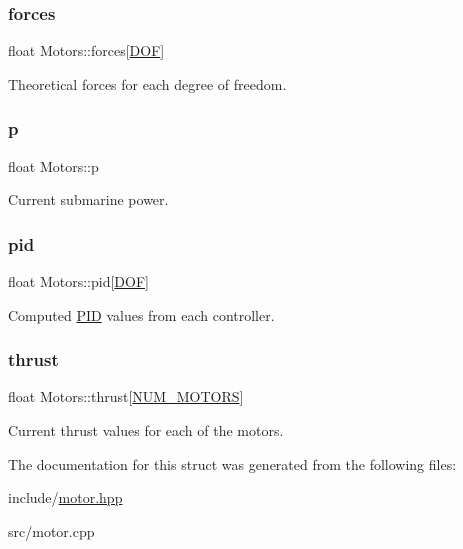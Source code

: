 \subsubsection{\texorpdfstring{forces}{forces}}
{\footnotesize\ttfamily float Motors\+::forces\mbox{[}\hyperlink{config_8h_ab5c558d88abd9517fb657be4889ee1bc}{D\+OF}\mbox{]}}

Theoretical forces for each degree of freedom. \mbox{\label{structMotors_a46e39ac60edebef57fca46f878e2c0b5}} 
\subsubsection{\texorpdfstring{p}{p}}
{\footnotesize\ttfamily float Motors\+::p}

Current submarine power. \mbox{\label{structMotors_a94c46cb5dab8c60c9fae75cc6b7af629}} 
\subsubsection{\texorpdfstring{pid}{pid}}
{\footnotesize\ttfamily float Motors\+::pid\mbox{[}\hyperlink{config_8h_ab5c558d88abd9517fb657be4889ee1bc}{D\+OF}\mbox{]}}

Computed \hyperlink{structPID}{P\+ID} values from each controller. \mbox{\label{structMotors_ac8d20987287ffda85eed109c3bf80a12}} 
\subsubsection{\texorpdfstring{thrust}{thrust}}
{\footnotesize\ttfamily float Motors\+::thrust\mbox{[}\hyperlink{config_8h_ae84658f12c2f1b44f59af36678cf3dcc}{N\+U\+M\+\_\+\+M\+O\+T\+O\+RS}\mbox{]}}

Current thrust values for each of the motors. 

The documentation for this struct was generated from the following files\+:\begin{DoxyCompactItemize}
\item 
include/\hyperlink{motor_8hpp}{motor.\+hpp}\item 
src/motor.\+cpp\end{DoxyCompactItemize}
